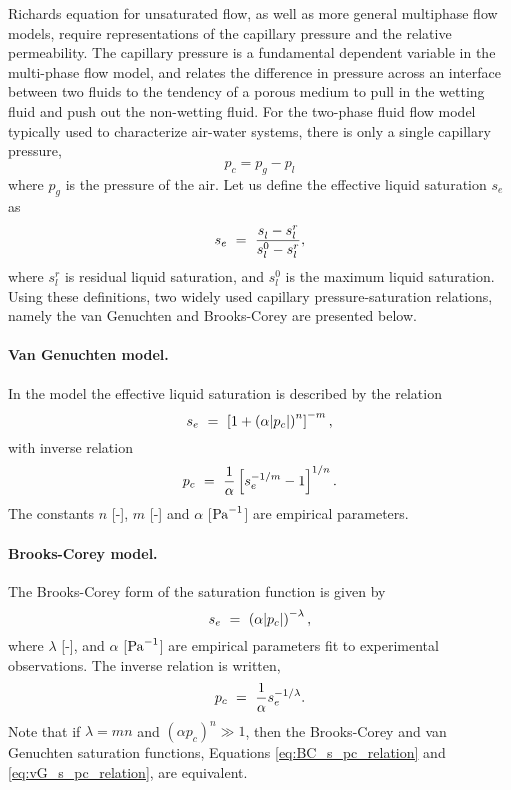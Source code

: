 Richards equation for unsaturated flow, as well as more general
multiphase flow models, require representations of the capillary
pressure and the relative permeability.  The capillary pressure is a
fundamental dependent variable in the multi-phase flow model, and
relates the difference in pressure across an interface between two
fluids to the tendency of a porous medium to pull in the wetting fluid
and push out the non-wetting fluid.
For the two-phase fluid flow model typically used to
characterize air-water systems, there is only a single capillary pressure,
\begin{equation} \label{eq:GasLiquidCapillaryPressure}
  p_c = p_g - p_l
\end{equation}
where $p_g$ is the pressure of the air. 
Let us define the effective liquid saturation $s_e$ as
\begin{equation}
\label{eq:SaturationDefinition}
s_e \ =\  \frac{s_l^{} - s_l^r}{s_l^0 - s_l^r}, 
\end{equation}
where $s_l^r$ is residual liquid saturation, and $s_l^0$ is the maximum liquid saturation.
Using these definitions, two widely
used capillary pressure-saturation relations, namely the van Genuchten
\citep{van1980closed} and Brooks-Corey \citep{brooks1964hydraulic} are
presented below.


\paragraph{Van Genuchten model.}
In the \citet{van1980closed} model the effective liquid saturation is
described by the relation
%
\begin{equation}  
  \label{eq:vG_s_pc_relation}
  s_e \ =\  \left[1+\left( \alpha |p_c| \right)^n \right]^{-m}, 
\end{equation}
%
with inverse relation
\begin{equation}
  \label{eq:vG_pc_s_relation}
  p_c \ =\  \frac{1}{\alpha} \left[ s_e^{-1/m} -1 \right]^{1/n}.
\end{equation}
%
The constants $n$ [-], $m$ [-] and $\alpha$ [${\rm Pa}^{-1}$] are
empirical parameters.


\paragraph{Brooks-Corey model.}
The Brooks-Corey form of the saturation function \citep{brooks1964hydraulic} is given by
\begin{equation}
  \label{eq:BC_s_pc_relation}
  s_e \ =\  \left( \alpha |p_c| \right)^{-\lambda}, 
\end{equation}
where $\lambda$ [-], and $\alpha$ [${\rm Pa}^{-1}$] are empirical parameters fit to experimental
observations.
The inverse relation is written,
\begin{equation}
  \label{eq:BC_pc_s_relation}
  p_c \ =\  \frac{1}{\alpha} s_e^{-1/\lambda}.
\end{equation}
Note that if $\lambda = mn$ and
$(\alpha p_c)^n \gg 1$, then the Brooks-Corey and van Genuchten
saturation functions, Equations \eqref{eq:BC_s_pc_relation} and
\eqref{eq:vG_s_pc_relation}, are equivalent.


